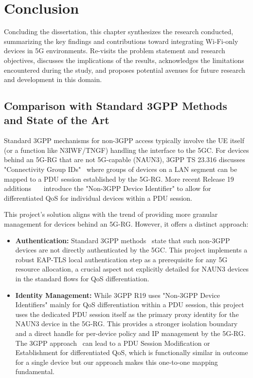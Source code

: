 \chapter{Conclusion}
\label{chapter:conclusion}

\begin{introduction}
Concluding the dissertation, this chapter synthesizes the research conducted, summarizing the key findings and contributions toward integrating Wi-Fi-only devices in \ac{5G} environments. Re-visits the problem statement and research objectives, discusses the implications of the results, acknowledges the limitations encountered during the study, and proposes potential avenues for future research and development in this domain.
\end{introduction}

\section{Comparison with Standard \ac{3GPP} Methods and State of the Art}

Standard \ac{3GPP} mechanisms for non-\ac{3GPP} access typically involve the \ac{UE} itself (or a function like \ac{N3IWF}/\ac{TNGF}) handling the interface to the \ac{5GC}. For devices behind an \ac{5G-RG} that are not \ac{5G}-capable (\ac{NAUN3}), \ac{3GPP} TS 23.316 discusses "Connectivity Group IDs"~\cite{23.316-p27} where groups of devices on a \ac{LAN} segment can be mapped to a \ac{PDU} session established by the \ac{5G-RG}. More recent Release 19 additions~\cite{23.316-p29}~\cite{23.316-p95}~\cite{23.501-p564} introduce the "Non-\ac{3GPP} Device Identifier" to allow for differentiated \ac{QoS} for individual devices within a \ac{PDU} session.

This project's solution aligns with the trend of providing more granular management for devices behind an \ac{5G-RG}. However, it offers a distinct approach:

\begin{itemize}
    \item \textbf{Authentication:} Standard \ac{3GPP} methods~\cite{23.501-p564} state that such non-\ac{3GPP} devices are not directly authenticated by the \ac{5GC}. This project implements a robust \ac{EAP-TLS} local authentication step as a prerequisite for any \ac{5G} resource allocation, a crucial aspect not explicitly detailed for \ac{NAUN3} devices in the standard flows for \ac{QoS} differentiation.

    \item \textbf{Identity Management:} While \ac{3GPP} R19 uses "Non-\ac{3GPP} Device Identifiers" mainly for \ac{QoS} differentiation within a \ac{PDU} session, this project uses the dedicated \ac{PDU} session itself as the primary proxy identity for the \ac{NAUN3} device in the \ac{5G-RG}. This provides a stronger isolation boundary and a direct handle for per-device policy and \ac{IP} management by the \ac{5G-RG}. The \ac{3GPP} approach~\cite{23.316-p95} can lead to a \ac{PDU} Session Modification or Establishment for differentiated \ac{QoS}, which is functionally similar in outcome for a single device but our approach makes this one-to-one mapping fundamental.
\end{itemize}

